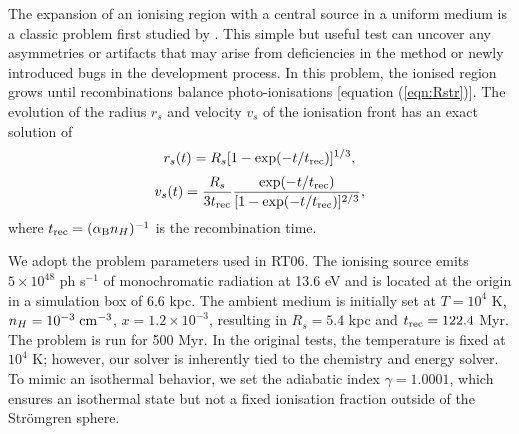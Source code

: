 \documentclass[useAMS,usenatbib]{mn2e}
\begin{document}
The expansion of an ionising region with a central source in a uniform
medium is a classic problem first studied by \citet{Stroemgren39}.
This simple but useful test can uncover any asymmetries or artifacts
that may arise from deficiencies in the method or newly introduced
bugs in the development process.  In this problem, the ionised region
grows until recombinations balance photo-ionisations [equation
(\ref{eqn:Rstr})].  The evolution of the radius $r_s$ and velocity
$v_s$ of the ionisation front has an exact solution of
%
\begin{equation}
  \label{eqn:rstr}
  r_s(t) = R_s [ 1 - \exp(-t/t_{\rm rec}) ]^{1/3},
\end{equation}
\begin{equation}
  \label{eqn:vstr}
  v_s(t) = \frac{R_s}{3t_{\rm rec}} \frac{\exp(-t/t_{\rm rec})} {[1 -
    \exp(-t/t_{\rm rec})]^{2/3}},
\end{equation}
where $t_{\rm rec} = (\alpha_{\rm B} n_H)^{-1}$ is the recombination
time.

We adopt the problem parameters used in RT06.  The ionising
source emits $5 \times 10^{48}$ ph s$^{-1}$ of monochromatic radiation
at 13.6 eV and is located at the origin in a simulation box of 6.6
kpc.  The ambient medium is initially set at $T=10^4$ K, $n_H =
10^{-3}\;\cubecm$, $x = 1.2 \times 10^{-3}$, resulting in $R_s = 5.4$
kpc and $t_{\rm rec} = 122.4$ Myr.  The problem is run for 500 Myr.
In the original tests, the temperature is fixed at $10^4$ K; however,
our solver is inherently tied to the chemistry and energy solver.  To
mimic an isothermal behavior, we set the adiabatic index $\gamma =
1.0001$, which ensures an isothermal state but not a fixed ionisation
fraction outside of the Str\"{o}mgren sphere.
\end{document}

